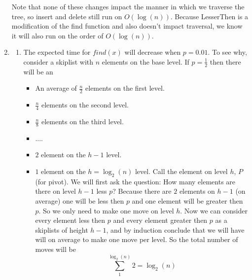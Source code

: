 \documentclass[11pt]{article}
\begin{document}
\begin{enumerate}
		Note that none of these changes impact the manner in which we
		traverse the tree, so insert and delete still run on
		$O(\log(n))$.
		Because LesserThen is a modification of the find function and
		also doesn't impact traversal, we know it will also run on the
		order of $O(\log(n))$.
	\item 

	\begin{enumerate}
		\item 
		The expected time for $\textit{find}(x)$ will decrease when
		$p=0.01$. To see why, consider a skiplist with $n$ elements on
		the base level. If $p = \frac{1}{2}$ then there will be an
		\begin{itemize}
		\item An average of $\frac{n}{2}$ elements on the first level.
		\item $\frac{n}{4}$ elements on the second level.
		\item $\frac{n}{8}$ elements on the third level.
		\item ....
		\item $2$ element on the $h - 1 $ level.
		\item $1$ element on the $h =\log_2(n)$ level.
			Call the element on level $h$, $P$ (for pivot).
			We will first ask the question: How many elements are
				there on level $h-1$ less $p$?
				Because there are $2$ elements on
				$h-1$ (on average) one will
				be less then $p$ and one element will be greater
				then $p$. So we only need to make one move on
				level $h$.
				Now we can consider every element less then $p$
				and every element greater then $p$
				as a skiplists of height $h-1$, and by induction
				conclude that we will have will on average 
				to make one move per level.
			So the total number of moves will be
				$$\sum_1^{\log_2(n)}2 = \log_2(n)$$
			

\end{itemize}
\end{enumerate}
\end{enumerate}
\end{document}
